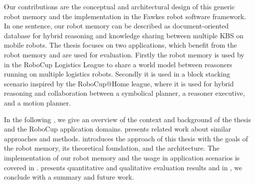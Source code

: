 Our contributions are the conceptual and architectural design of this
generic robot memory and the implementation in the Fawkes robot
software framework. In one sentence, our robot memory can be described
as document-oriented database for hybrid reasoning and knowledge
sharing between multiple KBS on mobile robots. The thesis focuses on
two applications, which benefit from the robot memory and are used for
evaluation. Firstly the robot memory is used by in the RoboCup
Logistics League to share a world model between reasoners running on
multiple logistics robots. Secondly it is used in a block stacking
scenario inspired by the RoboCup@Home league, where it is used for
hybrid reasoning and collaboration between a symbolical
planner, a reasoner executive, and a motion planner.

In the following , we give an overview of the
context and background of the thesis and the RoboCup application
domains.  presents related work about similar
approaches and methods.   introduces the
approach of this thesis with the goals of the robot memory, its
theoretical foundation, and the architecture. The implementation of
our robot memory and the usage in application scenarios is covered in
.  presents quantitative and
qualitative evaluation results and in , we
conclude with a summary and future work.
